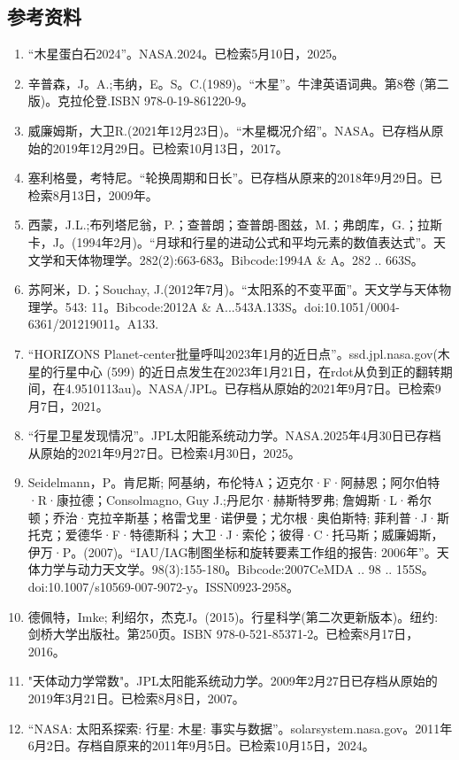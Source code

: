 \subsection{参考资料}
\begin{enumerate}
\item “木星蛋白石2024”。NASA.2024。已检索5月10日，2025。
\item 辛普森，J。A.;韦纳，E。S。C.(1989)。“木星”。牛津英语词典。第8卷 (第二版)。克拉伦登.ISBN 978-0-19-861220-9。
\item 威廉姆斯，大卫R.(2021年12月23日)。“木星概况介绍”。NASA。已存档从原始的2019年12月29日。已检索10月13日，2017。
\item 塞利格曼，考特尼。“轮换周期和日长”。已存档从原来的2018年9月29日。已检索8月13日，2009年。
\item 西蒙，J.L.;布列塔尼翁，P.；查普朗；查普朗-图兹，M.；弗朗库，G.；拉斯卡，J。(1994年2月)。“月球和行星的进动公式和平均元素的数值表达式”。天文学和天体物理学。282(2):663-683。Bibcode:1994A & A。282 .. 663S。
\item 苏阿米，D.；Souchay, J.(2012年7月)。“太阳系的不变平面”。天文学与天体物理学。543: 11。Bibcode:2012A & A...543A.133S。doi:10.1051/0004-6361/201219011。A133.
\item “HORIZONS Planet-center批量呼叫2023年1月的近日点”。ssd.jpl.nasa.gov(木星的行星中心 (599) 的近日点发生在2023年1月21日，在rdot从负到正的翻转期间，在4.9510113au)。NASA/JPL。已存档从原始的2021年9月7日。已检索9月7日，2021。
\item “行星卫星发现情况”。JPL太阳能系统动力学。NASA.2025年4月30日已存档从原始的2021年9月27日。已检索4月30日，2025。
\item Seidelmann，P。肯尼斯; 阿基纳，布伦特A；迈克尔·F·阿赫恩；阿尔伯特·R·康拉德；Consolmagno, Guy J.;丹尼尔·赫斯特罗弗; 詹姆斯·L·希尔顿；乔治·克拉辛斯基；格雷戈里·诺伊曼；尤尔根·奥伯斯特; 菲利普·J·斯托克；爱德华·F·特德斯科；大卫·J·索伦；彼得·C·托马斯；威廉姆斯，伊万·P。(2007)。“IAU/IAG制图坐标和旋转要素工作组的报告: 2006年”。天体力学与动力天文学。98(3):155-180。Bibcode:2007CeMDA .. 98 .. 155S。doi:10.1007/s10569-007-9072-y。ISSN0923-2958。 
\item 德佩特，Imke; 利绍尔，杰克J。(2015)。行星科学(第二次更新版本)。纽约: 剑桥大学出版社。第250页。ISBN 978-0-521-85371-2。已检索8月17日，2016。
\item "天体动力学常数"。JPL太阳能系统动力学。2009年2月27日已存档从原始的2019年3月21日。已检索8月8日，2007。
\item “NASA: 太阳系探索: 行星: 木星: 事实与数据”。solarsystem.nasa.gov。2011年6月2日。存档自原来的2011年9月5日。已检索10月15日，2024。

\end{enumerate}
